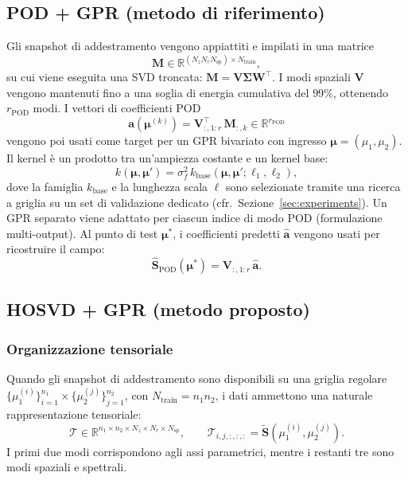 \subsection{POD + GPR (metodo di riferimento)}

Gli snapshot di addestramento vengono appiattiti e impilati in una matrice
\begin{equation}
    \mathbf{M} \in \mathbb{R}^{(N_z N_r N_{\mathrm{sp}}) \times N_{\mathrm{train}}},
\end{equation}
su cui viene eseguita una SVD troncata: $\mathbf{M} = \mathbf{V} \boldsymbol{\Sigma} \mathbf{W}^\top$. I modi spaziali $\mathbf{V}$ vengono mantenuti fino a una soglia di energia cumulativa del $99\%$, ottenendo $r_{\mathrm{POD}}$ modi. I vettori di coefficienti POD
\begin{equation}
    \mathbf{a}(\boldsymbol{\mu}^{(k)}) = \mathbf{V}_{:,1:r}^\top \, \mathbf{M}_{:,k} \in \mathbb{R}^{r_{\mathrm{POD}}}
\end{equation}
vengono poi usati come target per un GPR bivariato con ingresso $\boldsymbol{\mu} = (\mu_1, \mu_2)$. Il kernel è un prodotto tra un'ampiezza costante e un kernel base:
\begin{equation}
    k(\boldsymbol{\mu}, \boldsymbol{\mu}') = \sigma_f^2 \, k_{\mathrm{base}}(\boldsymbol{\mu}, \boldsymbol{\mu}'; \ell_1, \ell_2),
\end{equation}
dove la famiglia $k_{\mathrm{base}}$ e la lunghezza scala $\ell$ sono selezionate tramite una ricerca a griglia su un set di validazione dedicato (cfr.\ Sezione~\ref{sec:experiments}).
Un GPR separato viene adattato per ciascun indice di modo POD (formulazione multi-output). Al punto di test $\boldsymbol{\mu}^*$, i coefficienti predetti $\hat{\mathbf{a}}$ vengono usati per ricostruire il campo:
\begin{equation}
    \hat{\mathbf{S}}_{\mathrm{POD}}(\boldsymbol{\mu}^*) = \mathbf{V}_{:,1:r} \, \hat{\mathbf{a}}.
\end{equation}

\subsection{HOSVD + GPR (metodo proposto)}

\subsubsection{Organizzazione tensoriale}

Quando gli snapshot di addestramento sono disponibili su una griglia regolare $\{\mu_1^{(i)}\}_{i=1}^{n_1} \times \{\mu_2^{(j)}\}_{j=1}^{n_2}$, con $N_{\mathrm{train}} = n_1 n_2$, i dati ammettono una naturale rappresentazione tensoriale:
\begin{equation}
    \mathcal{T} \in \mathbb{R}^{n_1 \times n_2 \times N_z \times N_r \times N_{\mathrm{sp}}},
    \qquad
    \mathcal{T}_{i,j,:,:,:} = \tilde{\mathbf{S}}(\mu_1^{(i)}, \mu_2^{(j)}).
\end{equation}
I primi due modi corrispondono agli assi parametrici, mentre i restanti tre sono modi spaziali e spettrali.

